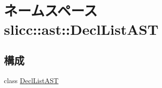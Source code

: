 \hypertarget{namespaceslicc_1_1ast_1_1DeclListAST}{
\section{ネームスペース slicc::ast::DeclListAST}
\label{namespaceslicc_1_1ast_1_1DeclListAST}
}
\subsection*{構成}
\begin{DoxyCompactItemize}
\item 
class \hyperlink{classslicc_1_1ast_1_1DeclListAST_1_1DeclListAST}{DeclListAST}
\end{DoxyCompactItemize}
